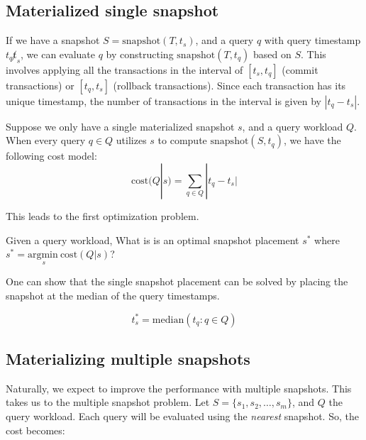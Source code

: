 \subsection{Materialized single snapshot}

\newcommand{\snapshot}{\mathrm{snapshot}}
\newcommand{\cost}{\mathrm{cost}}
\newcommand{\opt}{\mathrm{opt}}

If we have a snapshot $S = \mathrm{snapshot}(T, t_s)$, and a query $q$ with
query timestamp $t_q\not t_s$, we can evaluate $q$ by
constructing $\snapshot(T, t_q)$ based on $S$.  This involves applying all the
transactions in the interval of $[t_s, t_q]$ (commit transactions) or $[t_q,
t_s]$ (rollback transactions). Since each transaction has its unique timestamp,
the number of transactions in the interval is given by $|t_q - t_s|$.

Suppose we only have a single materialized snapshot $s$, and a query workload
$Q$.  When every query $q\in Q$ utilizes $s$ to compute $\snapshot(S, t_q)$,
we have the following cost model:
$$\cost(Q|s) = \sum_{q\in Q} |t_q - t_s|$$

This leads to the first optimization problem.

\newcommand{\argmin}[1]{\underset{#1}{\mathrm{argmin}\ }}

\begin{definition}
    Given a query workload, What is is an optimal snapshot placement $s^*$ where
    $s^* = \argmin{s}\cost(Q|s)$?
\end{definition}

One can show that the single snapshot placement can be solved by placing the
snapshot at the median of the query timestamps.

\begin{theorem}
    $$ t_s^* = \mathrm{median}(t_q : q\in Q) $$
    \label{thm:single}
\end{theorem}

\subsection{Materializing multiple snapshots}

Naturally, we expect to improve the performance with multiple snapshots.  This
takes us to the multiple snapshot problem. Let $S = \{s_1, s_2, \dots, s_m\}$,
and $Q$ the query workload.  Each query will be evaluated using the {\em nearest} snapshot.
So, the cost becomes:

